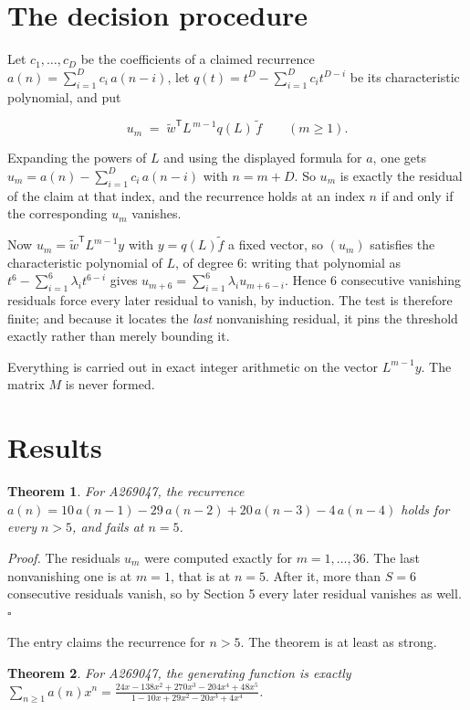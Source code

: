 \documentclass[11pt]{article}
\newtheorem{theorem}{Theorem}
\theoremstyle{definition}
\begin{document}
\section{The decision procedure}

Let $c_1,\dots,c_D$ be the coefficients of a claimed recurrence $a(n) = \sum_{i=1}^{D} c_i\,a(n-i)$, let $q(t) = t^{D} - \sum_{i=1}^{D} c_i t^{D-i}$ be its characteristic polynomial, and put

\[u_m \;=\; \tilde w^{\mathsf T} L^{\,m-1} q(L)\,\tilde f \qquad (m \ge 1).\]

Expanding the powers of $L$ and using the displayed formula for $a$, one gets $u_m = a(n) - \sum_{i=1}^{D} c_i\,a(n-i)$ with $n = m + D$. So $u_m$ is exactly the residual of the claim at that index, and the recurrence holds at an index $n$ if and only if the corresponding $u_m$ vanishes.

Now $u_m = \tilde w^{\mathsf T} L^{m-1} y$ with $y = q(L)\tilde f$ a fixed vector, so $(u_m)$ satisfies the characteristic polynomial of $L$, of degree $6$: writing that polynomial as $t^{6} - \sum_{i=1}^{6} \lambda_i t^{6-i}$ gives $u_{m+6} = \sum_{i=1}^{6} \lambda_i u_{m+6-i}$. Hence $6$ consecutive vanishing residuals force every later residual to vanish, by induction. The test is therefore finite; and because it locates the {\itshape last} nonvanishing residual, it pins the threshold exactly rather than merely bounding it.

Everything is carried out in exact integer arithmetic on the vector $L^{m-1}y$. The matrix $M$ is never formed.

\section{Results}

\begin{theorem} For A269047, the recurrence $a(n) = 10\,a(n-1) - 29\,a(n-2) + 20\,a(n-3) - 4\,a(n-4)$ holds for every $n > 5$, and fails at $n = 5$.\end{theorem}

{\itshape Proof.} The residuals $u_m$ were computed exactly for $m = 1,\dots,36$. The last nonvanishing one is at $m = 1$, that is at $n = 5$. After it, more than $S = 6$ consecutive residuals vanish, so by Section 5 every later residual vanishes as well. $\square$

The entry claims the recurrence for $n > 5$. The theorem is at least as strong.

\begin{theorem} For A269047, the generating function is exactly $\sum_{n\ge 1} a(n)x^n = \frac{24x - 138x^{2} + 270x^{3} - 204x^{4} + 48x^{5}}{1 - 10x + 29x^{2} - 20x^{3} + 4x^{4}}$.\end{theorem}
\end{document}
